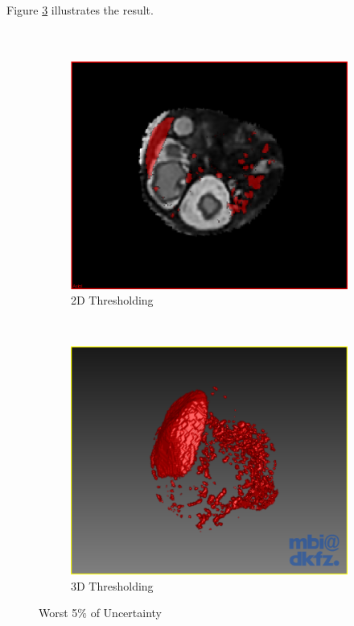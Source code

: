 Figure \ref{fig:threshold_settings_result} illustrates the result.\\\\\\

\begin{figure}[H]
  \centering
  \begin{subfigure}[b]{0.4\textwidth}
    \includegraphics[width=\textwidth]{images/thresholding/thresholding_2d.png}
    \caption{2D Thresholding}\label{fig:threshold_2d}
  \end{subfigure}%
  ~ %
  \begin{subfigure}[b]{0.4\textwidth}
    \includegraphics[width=\textwidth]{images/thresholding/thresholding_3d.png}
    \caption{3D Thresholding}\label{fig:threshold_3d}
  \end{subfigure}
  \caption{Worst 5$\%$ of Uncertainty}\label{fig:threshold_settings_result}
\end{figure}

